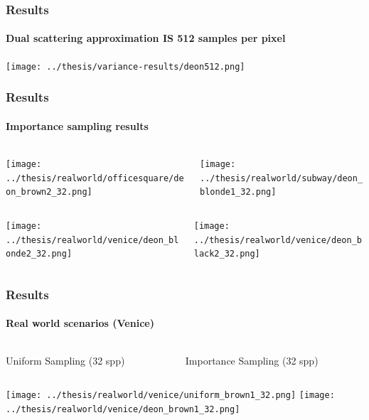 \documentclass{beamer}
\begin{document}
  \begin{frame}
    \frametitle{Results}
    \framesubtitle{Dual scattering approximation IS 512 samples per pixel}
    \centering
	\texttt{[image: ../thesis/variance-results/deon512.png]}    
  \end{frame}
  
  \begin{frame}
    \frametitle{Results}
    \framesubtitle{Importance sampling results}
    \centering
    
    \begin{columns}
    \begin{column}{0.5\textwidth}
    \texttt{[image: ../thesis/realworld/officesquare/deon\_brown2\_32.png]} 
    \end{column}
    \begin{column}{0.5\textwidth}
    \texttt{[image: ../thesis/realworld/subway/deon\_blonde1\_32.png]} 
    \end{column}
    \end{columns}
    
    \begin{columns}
    \begin{column}{0.5\textwidth}
    \texttt{[image: ../thesis/realworld/venice/deon\_blonde2\_32.png]} 
    \end{column}
    \begin{column}{0.5\textwidth}
    \texttt{[image: ../thesis/realworld/venice/deon\_black2\_32.png]} 
    \end{column}
    \end{columns}
       
  \end{frame}
  
  \begin{frame}
    \frametitle{Results}
    \framesubtitle{Real world scenarios (Venice)}
    \centering
    
    \begin{columns}
    \begin{column}{0.5\textwidth}
    \centering
    Uniform Sampling (32 spp) 
    \end{column}
	\begin{column}{0.5\textwidth}
	\centering
	Importance Sampling (32 spp)
	\end{column}
	\end{columns}  
    
	\texttt{[image: ../thesis/realworld/venice/uniform\_brown1\_32.png]}  
	\texttt{[image: ../thesis/realworld/venice/deon\_brown1\_32.png]}   
  \end{frame}
  
\end{document}

